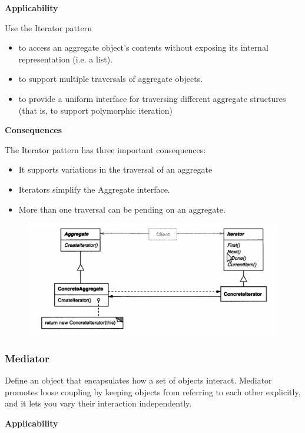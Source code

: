 \documentclass{article}
\begin{document}
\textbf{Applicability}

Use the Iterator pattern

\begin{itemize}
    \item to access an aggregate object's contents without exposing its internal representation (i.e. a list).
    \item to support multiple traversals of aggregate objects.
    \item to provide a uniform interface for traversing different aggregate structures (that is, to support polymorphic iteration)
\end{itemize}

\textbf{Consequences}

The Iterator pattern has three important consequences:
\begin{itemize}
    \item It supports variations in the traversal of an aggregate
    \item Iterators simplify the Aggregate interface.
    \item More than one traversal can be pending on an aggregate.
\end{itemize}

\begin{figure}[h]
    \centering
    \includegraphics[width=14cm]{diagrams/pattern-16-iterator.png}
\end{figure}

\newpage
\subsubsection{Mediator}
Define an object that encapsulates how a set of objects interact. Mediator promotes loose coupling by keeping objects from referring to each other explicitly, and it lets you vary their interaction independently.

\textbf{Applicability}
\end{document}
